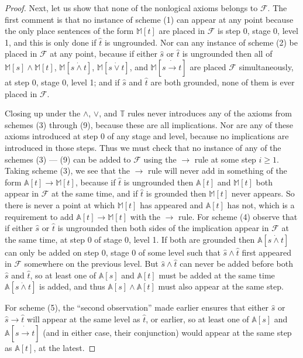 \documentclass[10pt,a4paper]{amsart}
\begin{document}
\begin{proof}
  Next, let us show that none of the nonlogical axioms belongs to $\mathcal{F}$. The first comment is that
  no instance of scheme (1) can appear at any point because the only place sentences of the form
  $\mathbb{M}[t]$ are placed in $\mathcal{F}$ is step 0, stage 0, level 1, and this is only done if
  $\hat{t}$ is ungrounded.
  Nor can any instance of scheme (2) be placed in $\mathcal{F}$ at any point, because if either $\hat{s}$ or
  $\hat{t}$ is ungrounded then all of $\mathbb{M}[s] \wedge \mathbb{M}[t]$, $\mathbb{M}[s \dot{\wedge} t]$,
  $\mathbb{M}[s \dot{\vee} t]$, and $\mathbb{M}[s \dot{\to} t]$ are placed $\mathcal{F}$ simultaneously, at
  step 0, stage 0, level 1; and if $\hat{s}$ and $\hat{t}$ are both grounded, none of them is ever placed in
  $\mathcal{F}$.

  Closing up under the $\wedge$, $\vee$, and $\mathbb{T}$ rules never introduces any of the axioms from schemes
  (3) through (9), because these are all implications. Nor are any of these axioms introduced at step 0 of any
  stage and level, because no implications are introduced in those steps. Thus
  we must check that no instance of any of the schemes (3) --- (9) can be added to $\mathcal{F}$ using
  the $\to$ rule at some step $i \geq 1$. Taking scheme (3), we see that the $\to$ rule will never add in
  something of the form $\mathbb{A}[t] \to \mathbb{M}[t]$, because if $\hat{t}$ is ungrounded then
  $\mathbb{A}[t]$ and $\mathbb{M}[t]$ both appear in $\mathcal{F}$ at the same time,
  and if $\hat{t}$ is grounded then $\mathbb{M}[t]$ never appears. So there is never a point
  at which $\mathbb{M}[t]$ has appeared and $\mathbb{A}[t]$ has not, which is a requirement to
  add $\mathbb{A}[t] \to \mathbb{M}[t]$ with the $\to$ rule.
  For scheme (4) observe that if either $\hat{s}$ or $\hat{t}$ is ungrounded then both sides of the implication
  appear in $\mathcal{F}$ at the same time, at step 0 of stage 0, level 1. If both are grounded then
  $\mathbb{A}[s \dot{\wedge} t]$ can only be added on step 0, stage 0 of some level such that $\hat{s}\wedge\hat{t}$
  first appeared in $\mathcal{F}$ somewhere on the previous level. But
  $\hat{s}\wedge\hat{t}$ can never be added before both $\hat{s}$ and $\hat{t}$, so at least one of
  $\mathbb{A}[s]$ and $\mathbb{A}[t]$ must be added at the same time $\mathbb{A}[s\dot{\wedge} t]$ is added,
  and thus $\mathbb{A}[s] \wedge \mathbb{A}[t]$ must also appear at the same step.

  For scheme (5), the ``second observation'' made earlier ensures that either $\hat{s}$ or $\hat{s} \to \hat{t}$
  will appear at the same level as $\hat{t}$, or earlier, so at least one of $\mathbb{A}[s]$ and
  $\mathbb{A}[s\dot{\to} t]$ (and in either case, their conjunction)
  would appear at the same step as $\mathbb{A}[t]$, at the latest.


\end{proof}
\end{document}
